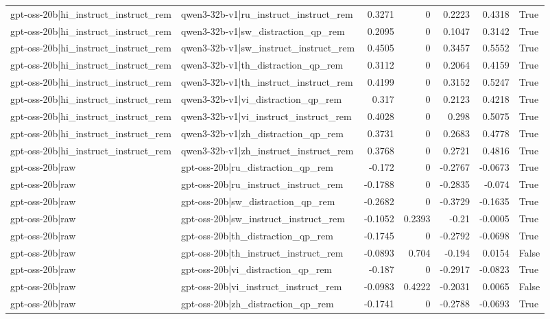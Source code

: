 \begin{table}
\begin{tabular}{l l r r r r l}
gpt-oss-20b|hi_instruct_instruct_rem & qwen3-32b-v1|ru_instruct_instruct_rem & 0.3271 & 0 & 0.2223 & 0.4318 & True \\
gpt-oss-20b|hi_instruct_instruct_rem & qwen3-32b-v1|sw_distraction_qp_rem & 0.2095 & 0 & 0.1047 & 0.3142 & True \\
gpt-oss-20b|hi_instruct_instruct_rem & qwen3-32b-v1|sw_instruct_instruct_rem & 0.4505 & 0 & 0.3457 & 0.5552 & True \\
gpt-oss-20b|hi_instruct_instruct_rem & qwen3-32b-v1|th_distraction_qp_rem & 0.3112 & 0 & 0.2064 & 0.4159 & True \\
gpt-oss-20b|hi_instruct_instruct_rem & qwen3-32b-v1|th_instruct_instruct_rem & 0.4199 & 0 & 0.3152 & 0.5247 & True \\
gpt-oss-20b|hi_instruct_instruct_rem & qwen3-32b-v1|vi_distraction_qp_rem & 0.317 & 0 & 0.2123 & 0.4218 & True \\
gpt-oss-20b|hi_instruct_instruct_rem & qwen3-32b-v1|vi_instruct_instruct_rem & 0.4028 & 0 & 0.298 & 0.5075 & True \\
gpt-oss-20b|hi_instruct_instruct_rem & qwen3-32b-v1|zh_distraction_qp_rem & 0.3731 & 0 & 0.2683 & 0.4778 & True \\
gpt-oss-20b|hi_instruct_instruct_rem & qwen3-32b-v1|zh_instruct_instruct_rem & 0.3768 & 0 & 0.2721 & 0.4816 & True \\
gpt-oss-20b|raw & gpt-oss-20b|ru_distraction_qp_rem & -0.172 & 0 & -0.2767 & -0.0673 & True \\
gpt-oss-20b|raw & gpt-oss-20b|ru_instruct_instruct_rem & -0.1788 & 0 & -0.2835 & -0.074 & True \\
gpt-oss-20b|raw & gpt-oss-20b|sw_distraction_qp_rem & -0.2682 & 0 & -0.3729 & -0.1635 & True \\
gpt-oss-20b|raw & gpt-oss-20b|sw_instruct_instruct_rem & -0.1052 & 0.2393 & -0.21 & -0.0005 & True \\
gpt-oss-20b|raw & gpt-oss-20b|th_distraction_qp_rem & -0.1745 & 0 & -0.2792 & -0.0698 & True \\
gpt-oss-20b|raw & gpt-oss-20b|th_instruct_instruct_rem & -0.0893 & 0.704 & -0.194 & 0.0154 & False \\
gpt-oss-20b|raw & gpt-oss-20b|vi_distraction_qp_rem & -0.187 & 0 & -0.2917 & -0.0823 & True \\
gpt-oss-20b|raw & gpt-oss-20b|vi_instruct_instruct_rem & -0.0983 & 0.4222 & -0.2031 & 0.0065 & False \\
gpt-oss-20b|raw & gpt-oss-20b|zh_distraction_qp_rem & -0.1741 & 0 & -0.2788 & -0.0693 & True \\

\end{tabular}
\end{table}
